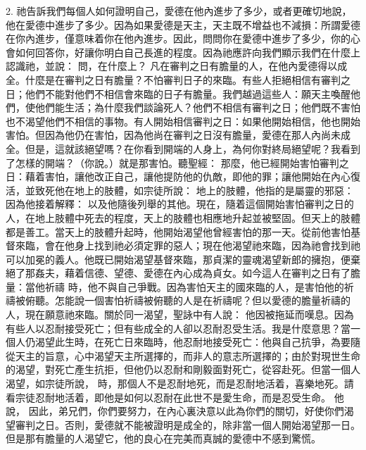 2.   祂告訴我們每個人如何證明自己，愛德在他內進步了多少，或者更確切地說，他在愛德中進步了多少。因為如果愛德是天主，天主既不增益也不減損：所謂愛德在你內進步，僅意味着你在他內進步。因此，問問你在愛德中進步了多少，你的心會如何回答你，好讓你明白自己長進的程度。因為祂應許向我們顯示我們在什麼上認識祂，並說： 問，在什麼上？ 凡在審判之日有膽量的人，在他內愛德得以成全。什麼是在審判之日有膽量？不怕審判日子的來臨。有些人拒絕相信有審判之日；他們不能對他們不相信會來臨的日子有膽量。我們越過這些人：願天主喚醒他們，使他們能生活；為什麼我們談論死人？他們不相信有審判之日；他們既不害怕也不渴望他們不相信的事物。有人開始相信審判之日：如果他開始相信，他也開始害怕。但因為他仍在害怕，因為他尚在審判之日沒有膽量，愛德在那人內尚未成全。但是，這就該絕望嗎？在你看到開端的人身上，為何你對終局絕望呢？我看到了怎樣的開端？（你說。）就是那害怕。聽聖經： 那麼，他已經開始害怕審判之日：藉着害怕，讓他改正自己，讓他提防他的仇敵，即他的罪；讓他開始在內心復活，並致死他在地上的肢體，如宗徒所說：  地上的肢體，他指的是屬靈的邪惡：因為他接着解釋：  以及他隨後列舉的其他。現在，隨着這個開始害怕審判之日的人，在地上肢體中死去的程度，天上的肢體也相應地升起並被堅固。但天上的肢體都是善工。當天上的肢體升起時，他開始渴望他曾經害怕的那一天。從前他害怕基督來臨，會在他身上找到祂必須定罪的惡人；現在他渴望祂來臨，因為祂會找到祂可以加冕的義人。他既已開始渴望基督來臨，那貞潔的靈魂渴望新郎的擁抱，便棄絕了那姦夫，藉着信德、望德、愛德在內心成為貞女。如今這人在審判之日有了膽量：當他祈禱  時，他不與自己爭戰。因為害怕天主的國來臨的人，是害怕他的祈禱被俯聽。怎能說一個害怕祈禱被俯聽的人是在祈禱呢？但以愛德的膽量祈禱的人，現在願意祂來臨。關於同一渴望，聖詠中有人說： 他因被拖延而嘆息。因為有些人以忍耐接受死亡；但有些成全的人卻以忍耐忍受生活。我是什麼意思？當一個人仍渴望此生時，在死亡日來臨時，他忍耐地接受死亡：他與自己抗爭，為要隨從天主的旨意，心中渴望天主所選擇的，而非人的意志所選擇的；由於對現世生命的渴望，對死亡產生抗拒，但他仍以忍耐和剛毅面對死亡，從容赴死。但當一個人渴望，如宗徒所說，  時，那個人不是忍耐地死，而是忍耐地活着，喜樂地死。請看宗徒忍耐地活着，即他是如何以忍耐在此世不是愛生命，而是忍受生命。 他說， 因此，弟兄們，你們要努力，在內心裏決意以此為你們的關切，好使你們渴望審判之日。否則，愛德就不能被證明是成全的，除非當一個人開始渴望那一日。但是那有膽量的人渴望它，他的良心在完美而真誠的愛德中不感到驚慌。\par

